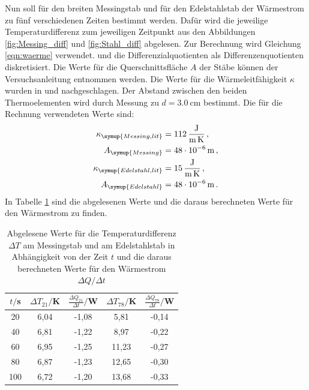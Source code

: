 Nun soll für den breiten Messingstab und für den Edelstahlstab der Wärmestrom
zu fünf verschiedenen Zeiten bestimmt werden. Dafür wird die jeweilige Temperaturdifferenz
zum jeweiligen Zeitpunkt aus den Abbildungen \ref{fig:Messing_diff} und
\ref{fig:Stahl_diff} abgelesen. Zur Berechnung wird Gleichung \eqref{eqn:waerme}
verwendet. und die Differenzialquotienten als Differenzenquotienten diskretisiert.
Die Werte für die Querschnittsfläche $A$ der Stäbe können der Versuchsanleitung
\cite{Versuchsanleitung} entnommen werden. Die Werte für die Wärmeleitfähigkeit $\kappa$ wurden
in \cite{Wärmeleitfähigkeit1} und \cite{Wärmeleitfähigkeit3}
nachgeschlagen. Der Abstand zwischen den beiden Thermoelementen
wird durch Messung zu $d=\SI{3.0}{\centi\meter}$ bestimmt. Die für die Rechnung verwendeten Werte sind:
\begin{align}
  \kappa_{\symup{Messing,lit}} &= \SI{112}{\joule\per\meter\per\kelvin}\,, \nonumber\\
  A_{\symup{Messing}} &= \SI{48e-6}{\meter}\,, \nonumber\\
  \kappa_{\symup{Edelstahl,lit}} &= \SI{15}{\joule\per\meter\per\kelvin}\,, \nonumber\\
  A_{\symup{Edelstahl}} &= \SI{48e-6}{\meter}\,. \nonumber
\end{align}
In Tabelle \ref{tab:waermestrom} sind die abgelesenen Werte und die daraus berechneten Werte
für den Wärmestrom zu finden.

\begin{table}
  \centering
  \caption{Abgelesene Werte für die Temperaturdifferenz $\Delta T$ am Messingstab und am Edelstahlstab
  in Abhängigkeit von der Zeit $t$ und die daraus berechneten Werte für den Wärmestrom
  $\Delta Q/\Delta t$}
  \label{tab:waermestrom}
  \begin{tabular}{c c c c c}
    \toprule
    $t/$s & $\Delta T_{21}/$K & $\frac{\Delta Q_{21}}{\Delta t}/$W & $\Delta T_{78}/$K & $\frac{\Delta Q_{78}}{\Delta t}/$W \\
    \midrule
    20  & 6,04  & -1,08 & 5,81  & -0,14 \\
    40  & 6,81  & -1,22 & 8,97  & -0,22 \\
    60  & 6,95  & -1,25 & 11,23 & -0,27 \\
    80  & 6,87  & -1,23 & 12,65 & -0,30 \\
    100 & 6,72  & -1,20 & 13,68 & -0,33 \\
    \bottomrule
  \end{tabular}
\end{table}


